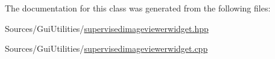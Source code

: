 The documentation for this class was generated from the following files\+:\begin{DoxyCompactItemize}
\item 
Sources/\+Gui\+Utilities/\hyperlink{supervisedimageviewerwidget_8hpp}{supervisedimageviewerwidget.\+hpp}\item 
Sources/\+Gui\+Utilities/\hyperlink{supervisedimageviewerwidget_8cpp}{supervisedimageviewerwidget.\+cpp}\end{DoxyCompactItemize}
